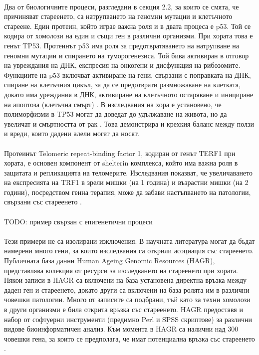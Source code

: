 \documentclass[pdftex,cyrillic,14pt,a4page,twoside,openright]{extreport}
\begin{document}
\paragraph{}
Два от биологичните процеси, разгледани в секция 2.2, за които се смята, че причиняват стареенето, са натрупването на геномни мутации и клетъчното стареене. Един протеин, който играе важна роля и в двата процеса е p53. Той се кодира от хомолози на един и същи ген в различни организми. При хората това е генът TP53. Протеинът p53 има роля за предотвратяването на натрупване на геномни мутации и спирането на туморогенезиса. Той бива активиран в отговор на увреждания на ДНК, експресия на онкогени и дисфункция на рибозомите. Функциите на p53 включват активиране на гени, свързани с поправката на ДНК, спиране на клетъчния цикъл, за да се предотврати размножаване на клетката, докато има уреждания в ДНК, активиране на клетъчното остаряване и инициране на апоптоза (клетъчна смърт) \cite{toufektchan2018}. В изследвания на хора е установено, че полиморфизми в TP53 могат да доведат до удължаване на живота, но да увеличат и смъртността от рак \cite{heemst2005}. Това демонстрира и крехкия баланс между ползи и вреди, които дадени алели могат да носят.

\paragraph{}
Протеинът Telomeric repeat-binding factor 1, кодиран от генът TERF1 при хората, е основен компонент от shelterin комплекса, който има важна роля в защитата и репликацията на теломерите. Изследвания показват, че увеличаването на експресията на TRF1 в зрели мишки (на 1 година) и възрастни мишки (на 2 години), посредством генна терапия, може да забави настъпването на патологии, свързани със стареенето \cite{derevyanko2017}.

\paragraph{}
TODO: пример свързан с епигенетични процеси

\paragraph{}
Тези примери не са изолирани изключения. В научната литература могат да бъдат намерени много гени, за които изследвания са открили асоциация със стареенето. Публичната база данни Human Ageing Genomic Resources (HAGR), представлява колекция от ресурси за изследването на стареенето при хората. Някои записи в HAGR са включени на база установена директна връзка между даден ген и стареенето, докато други са включени на база ролята им в различни човешки патологии. Много от записите са подбрани, тъй като за техни хомолози в други организми е била открита връзка със стареенето. HAGR предоставя и набор от софтуерни инструменти (предимно Perl и SPSS скриптове) за различни видове биоинформатичен анализ. Към момента в HAGR са налични над 300 човешки гена, за които се предполага, че имат потенциална връзка със стареенето \cite{tacutu2018}.
 
\end{document}
